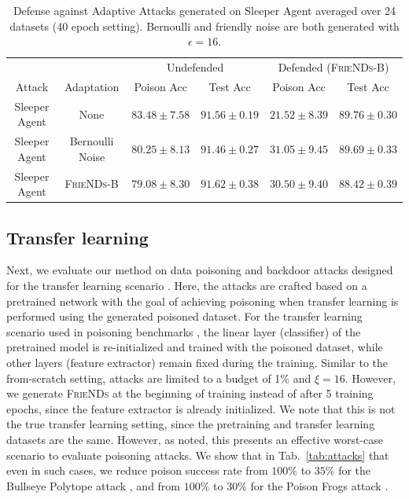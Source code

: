 \documentclass{article}
\newcommand{\alg}{\textsc{FrieNDs}}
\newcommand{\tabref}[1]{Tab.~\ref{#1}}
\begin{document}
\begin{table}[h]
    \centering
    \caption{Defense against Adaptive Attacks generated on Sleeper Agent averaged over 24 datasets (40 epoch setting). Bernoulli and friendly noise are both generated with $\epsilon=16$.}
    \label{tab:adaptive}
    \begin{tabular}{c|c|cc|cc}
    \toprule
        & & \multicolumn{2}{c}{Undefended} & \multicolumn{2}{c}{Defended (\alg-B)} \\
        Attack & Adaptation & Poison Acc & Test Acc & Poison Acc & Test Acc \\  
        \midrule
        Sleeper Agent & None & $83.48 \pm 7.58$ & $91.56 \pm 0.19$ & $21.52 \pm 8.39$ & $89.76 \pm 0.30$ \\ 
        Sleeper Agent & Bernoulli Noise & $80.25 \pm 8.13$ & $91.46 \pm 0.27$ & $31.05 \pm 9.45$ & $89.69 \pm 0.33$ \\ 
        Sleeper Agent & \alg-B & $79.08 \pm 8.30$ & $91.62 \pm 0.38$ & $30.50 \pm 9.40$ & $88.42 \pm 0.39$ \\
        \bottomrule
    \end{tabular}
\end{table}

\subsection{Transfer learning}
Next, we evaluate our method on data poisoning and backdoor attacks designed for the transfer learning scenario \cite{aghakhani2021bullseye,Shafahi2018poisonfrogs}. 
Here, the attacks are crafted based on a pretrained network with the goal of achieving poisoning when transfer learning is performed using the generated poisoned dataset. For the transfer learning scenario used in poisoning benchmarks \citep{geiping2021doesn,schwarzschild2020just}, the linear layer (classifier) of the pretrained model is re-initialized and trained with the poisoned dataset, while other layers (feature extractor) remain fixed during the training. Similar to the from-scratch setting, attacks are limited to a budget of 1\% and $\xi=16$. However, we generate \alg{} at the beginning of training instead of after 5 training epochs, since the feature extractor is already initialized. We note that this is not the true transfer learning setting, since the pretraining and transfer learning datasets are the same. However, as \citep{geiping2020witches,geiping2021doesn} noted, this presents an effective worst-case scenario to evaluate poisoning attacks. We show that in \tabref{tab:attacks} that even in such cases, we reduce poison success rate from $100\%$ to $35\%$ for the Bullseye Polytope attack \cite{aghakhani2021bullseye}, and from $100\%$ to $30\%$ for the Poison Frogs attack \cite{Shafahi2018poisonfrogs}.
\end{document}
